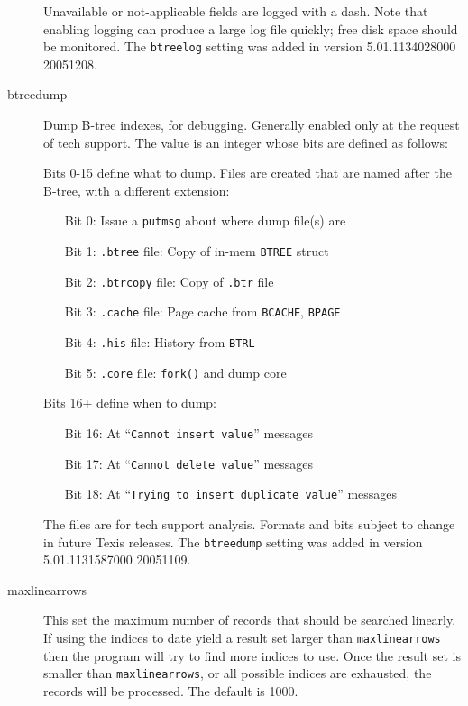 \begin{description}
Unavailable or not-applicable fields are logged with a dash.  Note
that enabling logging can produce a large log file quickly; free disk
space should be monitored.  The \verb`btreelog` setting was added in
version 5.01.1134028000 20051208.

\item[btreedump] Dump B-tree indexes, for debugging.  Generally enabled
only at the request of tech support.  The value is an integer whose
bits are defined as follows:

  Bits 0-15 define what to dump.  Files are created that are named after
the B-tree, with a different extension:
\begin{itemize}
  \item[Bit] 0: Issue a \verb`putmsg` about where dump file(s) are
  \item[Bit] 1: \verb`.btree` file: Copy of in-mem \verb`BTREE` struct
  \item[Bit] 2: \verb`.btrcopy` file: Copy of \verb`.btr` file
  \item[Bit] 3: \verb`.cache` file: Page cache from \verb`BCACHE`, \verb`BPAGE`
  \item[Bit] 4: \verb`.his` file: History from \verb`BTRL`
  \item[Bit] 5: \verb`.core` file: \verb`fork()` and dump core
\end{itemize}

Bits 16+ define when to dump:
\begin{itemize}
  \item[Bit] 16: At ``{\tt Cannot insert value}'' messages
  \item[Bit] 17: At ``{\tt Cannot delete value}'' messages
  \item[Bit] 18: At ``{\tt Trying to insert duplicate value}'' messages
\end{itemize}

The files are for tech support analysis.  Formats and bits subject to
change in future Texis releases.  The \verb`btreedump` setting was added
in version 5.01.1131587000 20051109.

\item[maxlinearrows] This set the maximum number of records that should
be searched linearly.  If using the indices to date yield a result set
larger than \verb`maxlinearrows` then the program will try to find more
indices to use.  Once the result set is smaller than \verb`maxlinearrows`,
or all possible indices are exhausted, the records will be processed.  The
default is 1000.


\end{description}
